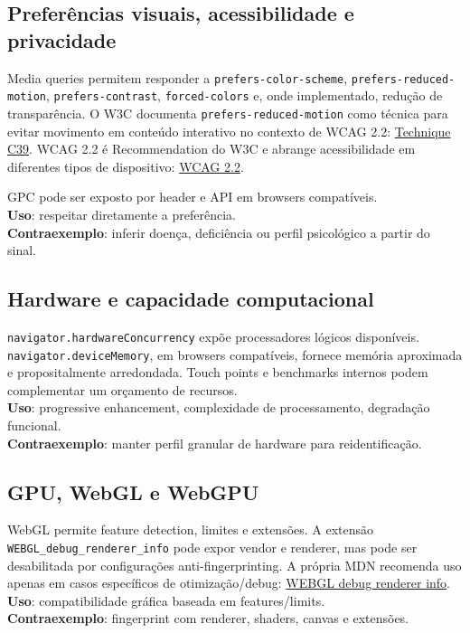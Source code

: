 \documentclass[11pt,a4paper]{article}
\begin{document}
\subsection{Preferências visuais, acessibilidade e privacidade}
Media queries permitem responder a \texttt{prefers-color-scheme}, \texttt{prefers-reduced-motion}, \texttt{prefers-contrast}, \texttt{forced-colors} e, onde implementado, redução de transparência. O W3C documenta \texttt{prefers-reduced-motion} como técnica para evitar movimento em conteúdo interativo no contexto de WCAG 2.2: \href{https://www.w3.org/WAI/WCAG22/Techniques/css/C39}{Technique C39}. WCAG 2.2 é Recommendation do W3C e abrange acessibilidade em diferentes tipos de dispositivo: \href{https://www.w3.org/TR/WCAG22/}{WCAG 2.2}.

GPC pode ser exposto por header e API em browsers compatíveis.\\
\textbf{Uso}: respeitar diretamente a preferência.\\
\textbf{Contraexemplo}: inferir doença, deficiência ou perfil psicológico a partir do sinal.

\subsection{Hardware e capacidade computacional}
\texttt{navigator.hardwareConcurrency} expõe processadores lógicos disponíveis. \texttt{navigator.deviceMemory}, em browsers compatíveis, fornece memória aproximada e propositalmente arredondada. Touch points e benchmarks internos podem complementar um orçamento de recursos.\\
\textbf{Uso}: progressive enhancement, complexidade de processamento, degradação funcional.\\
\textbf{Contraexemplo}: manter perfil granular de hardware para reidentificação.

\subsection{GPU, WebGL e WebGPU}
WebGL permite feature detection, limites e extensões. A extensão \texttt{WEBGL\_debug\_renderer\_info} pode expor vendor e renderer, mas pode ser desabilitada por configurações anti-fingerprinting. A própria MDN recomenda uso apenas em casos específicos de otimização/debug: \href{https://developer.mozilla.org/en-US/docs/Web/API/WEBGL_debug_renderer_info}{WEBGL debug renderer info}.\\
\textbf{Uso}: compatibilidade gráfica baseada em features/limits.\\
\textbf{Contraexemplo}: fingerprint com renderer, shaders, canvas e extensões.
\end{document}

